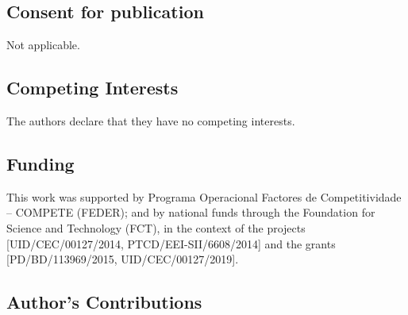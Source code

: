 \documentclass[a4paper,num-refs]{oup-contemporary}
\begin{document}



\subsection{Consent for publication}
Not applicable.



\subsection{Competing Interests}
The authors declare that they have no competing interests.


\subsection{Funding}
This work was supported by Programa Operacional Factores de Competitividade -- COMPETE (FEDER); and by national funds through the Foundation for Science and Technology (FCT), in the context of the projects [UID/CEC/00127/2014, PTCD/EEI-SII/6608/2014] and the grants [PD/BD/113969/2015, UID/CEC/00127/2019].


\subsection{Author's Contributions}
\end{document}
